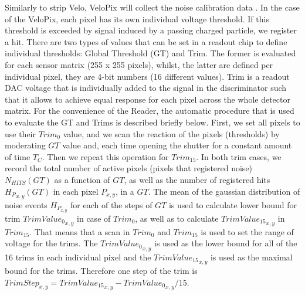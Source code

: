 

Similarly to strip Velo, VeloPix will collect the noise calibration data \cite{Kopciewicz:2723996}. In
the case of the VeloPix, each pixel has its own individual voltage threshold. If this
threshold is exceeded by signal induced by a passing charged particle, we register a hit.
There are two types of values that can be set in a readout chip to define individual thresholds: Global Threshold (GT) and Trim.
The former is evaluated for each sensor matrix (255 x 255 pixels), whilst, the latter are defined per individual pixel,  they are 4-bit numbers (16 different values).
Trim is a readout DAC voltage that is individually added to the signal in the discriminator such that it allows to achieve equal response for each pixel across the whole detector matrix.
For the convenience of the Reader, the automatic procedure that is used to evaluate the GT and Trims is described briefly below.
First, we set all pixels to use their $Trim_{0}$ value, and we scan the reaction of
the pixels (thresholds) by moderating $GT$ value and, each time opening the shutter for a constant
amount of time $T_{C}$. Then we repeat this operation for $Trim_{15}$.
In both trim cases, we record the total number of active pixels (pixels that registered noise)
$N_{HITS}(GT)$ as a function of $GT$, as well as the number of registered hits ${H_P}_{x,y}(GT)$ in each
pixel $P_{x,y}$, in a $GT$.
The mean of the gaussian distribution of noise events $H_{P_{x,y}}$ for each of the steps of $GT$ is
used to calculate lower bound for trim ${TrimValue_0}_{x,y}$ in case of
$Trim_{0}$, as well as to calculate ${TrimValue_{15}}_{x,y}$ in $Trim_{15}$.
That means that a scan in $Trim_{0}$ and $Trim_{15}$ is used to set the range of voltage for
the trims.
The ${TrimValue_{0}}_{x,y}$ is used as the lower bound for all of the 16 trims in
each individual pixel and the ${TrimValue_{15}}_{x,y}$ is used as the maximal bound for the trims.  Therefore one step of the trim is
$TrimStep_{x,y} ={TrimValue_{15}}_{x,y}-{TrimValue_{0}}_{x,y}/15 $.


